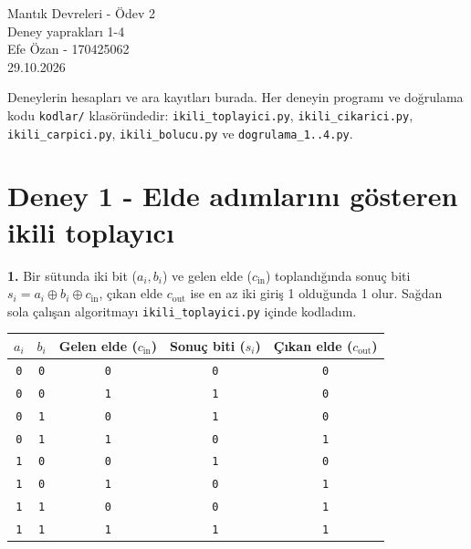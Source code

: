 \documentclass[10pt,a4paper]{article}
\begin{document}
\begin{center}
    {\LARGE Mantık Devreleri - Ödev 2}\\[5pt]
    {\large Deney yaprakları 1-4}\\[8pt]
    {\normalsize Efe Özan - 170425062}\\[4pt]
    {\normalsize 29.10.2026}
\end{center}
\vspace{2pt}

Deneylerin hesapları ve ara kayıtları burada. Her deneyin programı ve doğrulama kodu \texttt{kodlar/} klasöründedir:
\texttt{ikili\_toplayici.py}, \texttt{ikili\_cikarici.py}, \texttt{ikili\_carpici.py}, \texttt{ikili\_bolucu.py} ve \texttt{dogrulama\_1..4.py}.

\section*{Deney 1 - Elde adımlarını gösteren ikili toplayıcı}

\textbf{1.} Bir sütunda iki bit ($a_i, b_i$) ve gelen elde ($c_{\text{in}}$) toplandığında sonuç biti $s_i = a_i \oplus b_i \oplus c_{\text{in}}$, çıkan elde $c_{\text{out}}$ ise en az iki giriş 1 olduğunda 1 olur. Sağdan sola çalışan algoritmayı \texttt{ikili\_toplayici.py} içinde kodladım.

\begin{center}
\small
\begin{tabular}{ccccc}
\toprule
$a_i$ & $b_i$ & Gelen elde ($c_{\text{in}}$) & Sonuç biti ($s_i$) & Çıkan elde ($c_{\text{out}}$) \\
\midrule
\texttt{0} & \texttt{0} & \texttt{0} & \texttt{0} & \texttt{0} \\
\texttt{0} & \texttt{0} & \texttt{1} & \texttt{1} & \texttt{0} \\
\texttt{0} & \texttt{1} & \texttt{0} & \texttt{1} & \texttt{0} \\
\texttt{0} & \texttt{1} & \texttt{1} & \texttt{0} & \texttt{1} \\
\texttt{1} & \texttt{0} & \texttt{0} & \texttt{1} & \texttt{0} \\
\texttt{1} & \texttt{0} & \texttt{1} & \texttt{0} & \texttt{1} \\
\texttt{1} & \texttt{1} & \texttt{0} & \texttt{0} & \texttt{1} \\
\texttt{1} & \texttt{1} & \texttt{1} & \texttt{1} & \texttt{1} \\
\bottomrule
\end{tabular}
\end{center}
\end{document}
